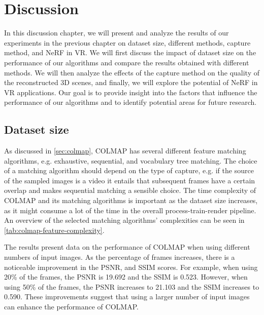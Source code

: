 \chapter{Discussion}

In this discussion chapter, we will present and analyze the results of our experiments in the previous chapter on dataset size, different methods, capture method, and NeRF in VR. We will first discuss the impact of dataset size on the performance of our algorithms and compare the results obtained with different methods. We will then analyze the effects of the capture method on the quality of the reconstructed 3D scenes, and finally, we will explore the potential of NeRF in VR applications. Our goal is to provide insight into the factors that influence the performance of our algorithms and to identify potential areas for future research.

\begin{comment}
- Loop back to the introduction, review - claim - agenda
    - In this thesis, we have seen how we can reconstruct 3D scenes and render novel views by optimizing NeRFs on 2D input images.
    - The pipeline for creating NeRFs has become greatly simplified recently. As we've seen we can without problems optimize a NeRF in ~4.5 minutes.


Results:
- Dataset size
- Different methods
- Capture method
- NeRF in VR

- Area size
\end{comment}

\section{Dataset size}
As discussed in \autoref{sec:colmap}, COLMAP has several different feature matching algorithms, e.g. exhaustive, sequential, and vocabulary tree matching. The choice of a matching algorithm should depend on the type of capture, e.g. if the source of the sampled images is a video it entails that subsequent frames have a certain overlap and makes sequential matching a sensible choice. The time complexity of COLMAP and its matching algorithms is important as the dataset size increases, as it might consume a lot of the time in the overall process-train-render pipeline. An overview of the selected matching algorithms' complexities can be seen in \autoref{tab:colmap-feature-complexity}.

The results present data on the performance of COLMAP when using different numbers of input images. As the percentage of frames increases, there is a noticeable improvement in the PSNR, and SSIM scores. For example, when using 20\% of the frames, the PSNR is 19.692 and the SSIM is 0.523. However, when using 50\% of the frames, the PSNR increases to 21.103 and the SSIM increases to 0.590. These improvements suggest that using a larger number of input images can enhance the performance of COLMAP.

